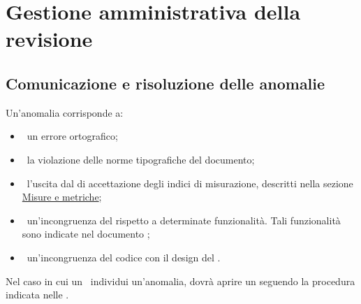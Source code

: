 
\section{Gestione amministrativa della revisione}
\label{gestione amministrativa della revisione}
	\subsection{Comunicazione e risoluzione delle anomalie}
	\label{comunicazione e risoluzione delle anomalie}
		Un'anomalia corrisponde a:
		\begin{itemize}
			\item\ un errore ortografico;
			\item\ la violazione delle norme tipografiche del documento;
			\item\ l'uscita dal  di accettazione degli indici di misurazione, descritti nella sezione \hyperref[misure e metriche]{Misure e metriche};
			\item\ un'incongruenza del  rispetto a determinate funzionalità. Tali funzionalità sono indicate nel documento \ARdoc;
			\item\ un'incongruenza del codice con il design del .
		\end{itemize}
		Nel caso in cui un \VER\ individui un'anomalia, dovrà aprire un  seguendo la procedura indicata nelle \NPdoc.